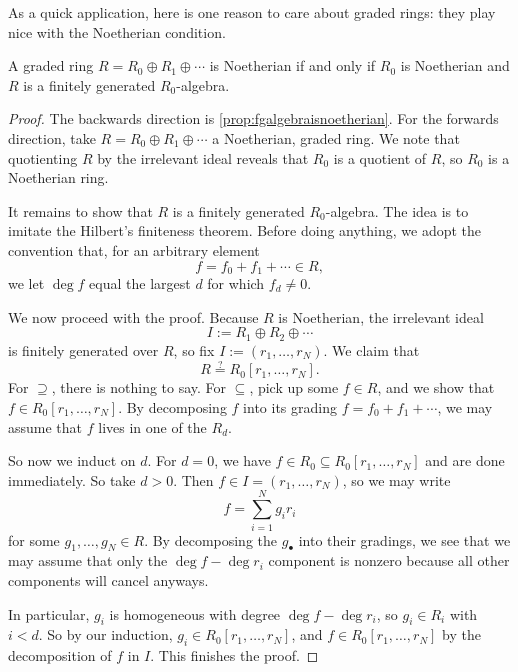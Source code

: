 As a quick application, here is one reason to care about graded rings: they play nice with the Noetherian condition.
\begin{proposition}
	A graded ring $R=R_0\oplus R_1\oplus\cdots$ is Noetherian if and only if $R_0$ is Noetherian and $R$ is a finitely generated $R_0$-algebra.
\end{proposition}
\begin{proof}
	The backwards direction is \autoref{prop:fgalgebraisnoetherian}. For the forwards direction, take $R=R_0\oplus R_1\oplus\cdots$ a Noetherian, graded ring. We note that quotienting $R$ by the irrelevant ideal reveals that $R_0$ is a quotient of $R$, so $R_0$ is a Noetherian ring.

	It remains to show that $R$ is a finitely generated $R_0$-algebra. The idea is to imitate the Hilbert's finiteness theorem. Before doing anything, we adopt the convention that, for an arbitrary element
	\[f=f_0+f_1+\cdots\in R,\]
	we let $\deg f$ equal the largest $d$ for which $f_d\ne0$.
	
	We now proceed with the proof. Because $R$ is Noetherian, the irrelevant ideal
	\[I:=R_1\oplus R_2\oplus\cdots\]
	is finitely generated over $R$, so fix $I:=(r_1,\ldots,r_N)$. We claim that
	\[R\stackrel?=R_0[r_1,\ldots,r_N].\]
	For $\supseteq$, there is nothing to say. For $\subseteq$, pick up some $f\in R$, and we show that $f\in R_0[r_1,\ldots,r_N]$. By decomposing $f$ into its grading $f=f_0+f_1+\cdots$, we may assume that $f$ lives in one of the $R_d$.

	So now we induct on $d$. For $d=0$, we have $f\in R_0\subseteq R_0[r_1,\ldots,r_N]$ and are done immediately. So take $d>0$. Then $f\in I=(r_1,\ldots,r_N)$, so we may write
	\[f=\sum_{i=1}^Ng_ir_i\]
	for some $g_1,\ldots,g_N\in R$. By decomposing the $g_\bullet$ into their gradings, we see that we may assume that only the $\deg f-\deg r_i$ component is nonzero because all other components will cancel anyways.
	
	In particular, $g_i$ is homogeneous with degree $\deg f-\deg r_i$, so $g_i\in R_i$ with $i<d$. So by our induction, $g_i\in R_0[r_1,\ldots,r_N]$, and $f\in R_0[r_1,\ldots,r_N]$ by the decomposition of $f$ in $I$. This finishes the proof.
\end{proof}

